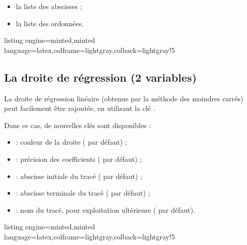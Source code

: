\documentclass[11pt,a4paper]{ltxdoc}
\begin{document}
\smallskip

\begin{itemize}
  \item la liste des abscisses ;
  \item la liste des ordonnées.
\end{itemize}

\begin{tcblisting}{listing engine=minted,minted language=latex,colframe=lightgray,colback=lightgray!5}
\begin{GraphiqueTikz}%
  [x=0.075cm,y=0.03cm,Xmin=0,Xmax=160,Xgrille=20,Xgrilles=10,
  Origy=250,Ymin=250,Ymax=400,Ygrille=25,Ygrilles=5]
\end{GraphiqueTikz}
\end{tcblisting}

\subsection{La droite de régression (2 variables)}\label{reglin}

La droite de régression linéaire (obtenue par la méthode des moindres carrés) peut facilement être rajoutée, en utilisant la clé .

\smallskip

Dans ce cas, de nouvelles clés sont disponibles :

\smallskip

\begin{itemize}
  \item {} : couleur de la droite ( par défaut) ;
  \item {} : précision des coefficients ( par défaut) ;
  \item {} : abscisse initiale du tracé ( par défaut) ;
  \item {} : abscisse terminale du tracé ( par défaut) ;
  \item {} : nom du tracé, pour exploitation ultérieure ( par défaut).
\end{itemize}

\begin{tcblisting}{listing engine=minted,minted language=latex,colframe=lightgray,colback=lightgray!5}
\begin{GraphiqueTikz}%
  [x=0.075cm,y=0.03cm,Xmin=0,Xmax=160,Xgrille=20,Xgrilles=10,
  Origy=250,Ymin=250,Ymax=400,Ygrille=25,Ygrilles=5]
\end{GraphiqueTikz}
\end{tcblisting}
\end{document}
